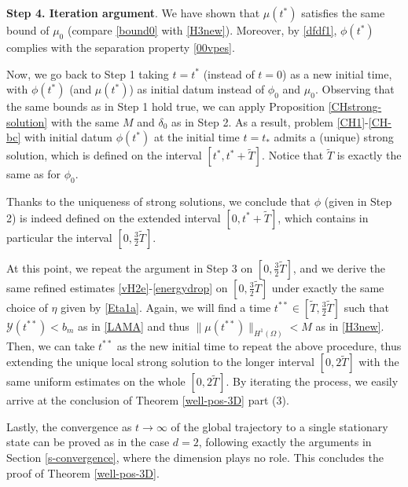 \documentclass[11pt,reqno]{amsart}
\theoremstyle{remark}
\numberwithin{equation}{section}
\newcommand{\vp}{\phi}
\begin{document}
 \medskip
\textbf{Step 4. Iteration argument}.
We have shown that $\mu(t^*)$ satisfies the same bound
of $\mu_0$ (compare \eqref{bound0} with \eqref{H3new}).
Moreover, by \eqref{dfdf1}, $\vp(t^*)$ complies with the separation property \eqref{00vpes}.


Now, we go back to Step 1 taking $t=t^*$ (instead of $t=0$) as a new initial time, with
$\vp(t^*)$ (and $\mu(t^*)$) as initial datum instead of $\phi_0$ and $\mu_0$. Observing that the same bounds as in Step 1 hold true, we can apply Proposition \ref{CHstrong-solution} with the same $M$ and $\delta_0$ as in Step 2. As a result, problem
\eqref{CH1}-\eqref{CH-bc} with initial datum $\phi(t^*)$ at the initial time $t=t_*$ admits a (unique) strong solution, which is
defined on the interval $[t^*, t^*+\widetilde{T}]$. Notice that $\widetilde{T}$ is exactly the same as for $\phi_0$.


Thanks to the uniqueness of strong solutions, we conclude that $\phi$ (given in Step 2) is indeed defined on the extended interval $[0,t^*+\widetilde{T}]$, which contains in particular the interval $[0,\frac32\widetilde{T}]$.

At this point, we repeat the argument in Step 3 on $[0,\frac32\widetilde{T}]$, and we derive the same refined estimates \eqref{vH2e}-\eqref{energydrop} on  $[0,\frac32\widetilde{T}]$ under exactly the same choice of $\eta$ given by \eqref{Eta1a}. Again, we will find a time $t^{**}\in [\widetilde{T},\frac32 \widetilde{T}]$ such that $\mathcal{Y}(t^{**})<b_m$ as in \eqref{LAMA} and thus $\|\mu(t^{**})\|_{H^1(\Omega)}<M$ as in \eqref{H3new}. Then, we can take $t^{**}$ as the new initial time to repeat the above procedure, thus extending the unique local strong solution to the longer interval $[0, 2\widetilde{T}]$ with the same uniform estimates on the whole $[0, 2\widetilde{T}]$. By iterating the process, we easily arrive at the conclusion of Theorem \ref{well-pos-3D} part (3).

\medskip
Lastly, the convergence as $t\to\infty$ of the global trajectory to a single stationary state can be proved as in the case $d=2$, following exactly the arguments in Section \ref{s-convergence}, where the dimension plays no role. This concludes the proof of Theorem \ref{well-pos-3D}.
\end{document}
